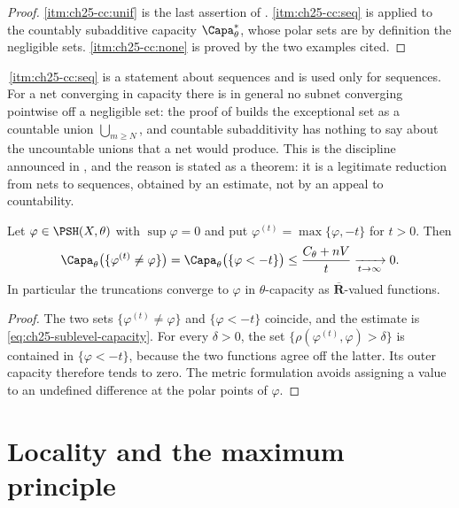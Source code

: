 \begin{proof}
\cref{itm:ch25-cc:unif} is the last assertion of
.  \cref{itm:ch25-cc:seq} is
 applied to the countably subadditive
capacity $\Capa^*_\theta$, whose polar sets are by definition the
negligible sets.  \cref{itm:ch25-cc:none} is proved by the two examples
cited.
\end{proof}

\begin{remark}
\label{rem:ch25-nets-in-capacity}
\,\cref{itm:ch25-cc:seq} is a
statement about sequences and is used only for sequences.  For a net
converging in capacity there is in general no subnet converging pointwise
off a negligible set: the proof of
 builds the exceptional set as a countable
union $\bigcup_{m\geq N}$, and countable subadditivity has nothing to say
about the uncountable unions that a net would produce.  This is the
discipline announced in , and the reason
 is stated as a theorem: it is a
legitimate reduction from nets to sequences, obtained by an estimate, not by
an appeal to countability.
\end{remark}

\begin{proposition}
\label{prop:ch25-truncation-capacity}
Let $\varphi\in\PSH(X,\theta)$ with $\sup\varphi=0$ and put
$\varphi^{(t)}=\max\{\varphi,-t\}$ for $t>0$.  Then
\[
 \Capa_\theta\bigl(\{\varphi^{(t)}\neq\varphi\}\bigr)
 =\Capa_\theta\bigl(\{\varphi<-t\}\bigr)
 \leq\frac{C_\theta+nV}{t}\xrightarrow[t\to\infty]{}0 .
\]
In particular the truncations converge to $\varphi$ in $\theta$-capacity as
$\overline{\mathbf R}$-valued functions.
\end{proposition}

\begin{proof}
The two sets $\{\varphi^{(t)}\neq\varphi\}$ and $\{\varphi<-t\}$
coincide, and the estimate is
\eqref{eq:ch25-sublevel-capacity}.  For every $\delta>0$, the set
$\{\rho(\varphi^{(t)},\varphi)>\delta\}$ is contained in
$\{\varphi<-t\}$, because the two functions agree off the latter.  Its outer
capacity therefore tends to zero.  The metric formulation avoids assigning
a value to an undefined difference at the polar points of $\varphi$.
\end{proof}

\section{Locality and the maximum principle}
\label{sec:ch25-maximum}

